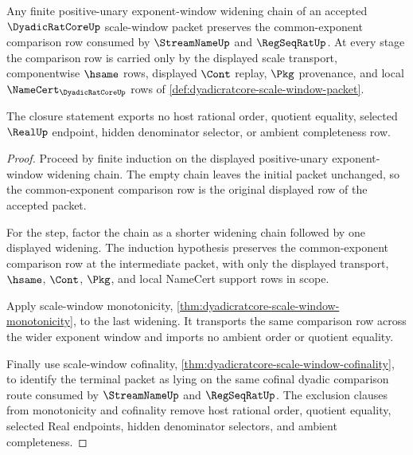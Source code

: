 \begin{theorem}
\label{thm:dyadicratcore-common-exponent-comparison-closure}
Any finite positive-unary exponent-window widening chain of an accepted $\DyadicRatCoreUp$ scale-window packet preserves the common-exponent comparison row consumed by $\StreamNameUp$ and $\RegSeqRatUp$. At every stage the comparison row is carried only by the displayed scale transport, componentwise $\hsame$ rows, displayed $\Cont$ replay, $\Pkg$ provenance, and local $\NameCert_{\DyadicRatCoreUp}$ rows of \autoref{def:dyadicratcore-scale-window-packet}.

The closure statement exports no host rational order, quotient equality, selected $\RealUp$ endpoint, hidden denominator selector, or ambient completeness row.
\end{theorem}
\begin{proof}
Proceed by finite induction on the displayed positive-unary exponent-window widening chain. The empty chain leaves the initial packet unchanged, so the common-exponent comparison row is the original displayed row of the accepted packet.

For the step, factor the chain as a shorter widening chain followed by one displayed widening. The induction hypothesis preserves the common-exponent comparison row at the intermediate packet, with only the displayed transport, $\hsame$, $\Cont$, $\Pkg$, and local NameCert support rows in scope.

Apply scale-window monotonicity, \autoref{thm:dyadicratcore-scale-window-monotonicity}, to the last widening. It transports the same comparison row across the wider exponent window and imports no ambient order or quotient equality.

Finally use scale-window cofinality, \autoref{thm:dyadicratcore-scale-window-cofinality}, to identify the terminal packet as lying on the same cofinal dyadic comparison route consumed by $\StreamNameUp$ and $\RegSeqRatUp$. The exclusion clauses from monotonicity and cofinality remove host rational order, quotient equality, selected Real endpoints, hidden denominator selectors, and ambient completeness.
\end{proof}

